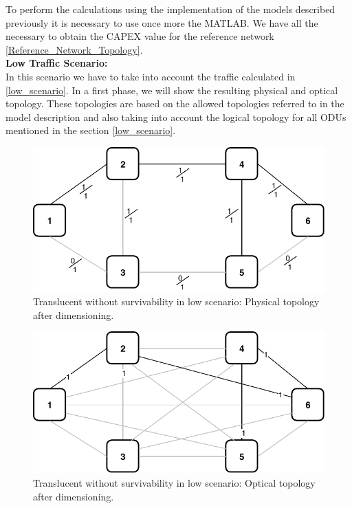 To perform the calculations using the implementation of the models described previously it is necessary to use once more the MATLAB. We have all the necessary to obtain the CAPEX value for the reference network \ref{Reference_Network_Topology}.\\

\textbf{Low Traffic Scenario:}\\

In this scenario we have to take into account the traffic calculated in \ref{low_scenario}. In a first phase, we will show the resulting physical and optical topology. These topologies are based on the allowed topologies referred to in the model description and also taking into account the logical topology for all ODUs mentioned in the section \ref{low_scenario}.\\

\newpage
\begin{figure}[h!]
\centering
\includegraphics[width=12cm]{sdf/ilp/translucent_survivability/figures/physical_topology_low}
\caption{Translucent without survivability in low scenario: Physical topology after dimensioning.}
\label{physical3_low}
\end{figure}

\begin{figure}[h!]
\centering
\includegraphics[width=12cm]{sdf/ilp/translucent_survivability/figures/optical_topology_low}
\caption{Translucent without survivability in low scenario: Optical topology after dimensioning.}
\label{optical3_low}
\end{figure}

